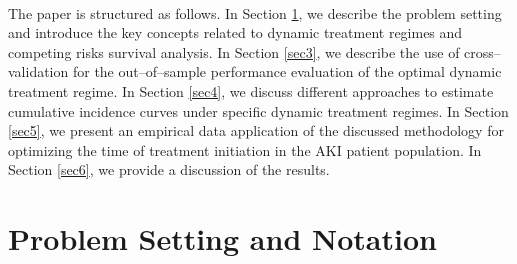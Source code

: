 \documentclass[12pt]{article}
\begin{document}
\\
\indent
The paper is structured as follows. In Section \ref{sec2}, we describe the problem setting and introduce the key concepts related to dynamic treatment regimes and competing risks survival analysis. In Section \ref{sec3}, we describe the use of cross--validation for the out--of--sample performance evaluation of the optimal dynamic treatment regime. In Section \ref{sec4}, we discuss different approaches to estimate cumulative incidence curves under specific dynamic treatment regimes. In Section \ref{sec5}, we present an empirical data application of the discussed methodology for optimizing the time of treatment initiation in the AKI patient population. In Section \ref{sec6}, we provide a discussion of the results. 

\section{Problem Setting and Notation}\label{sec2}
\end{document}

